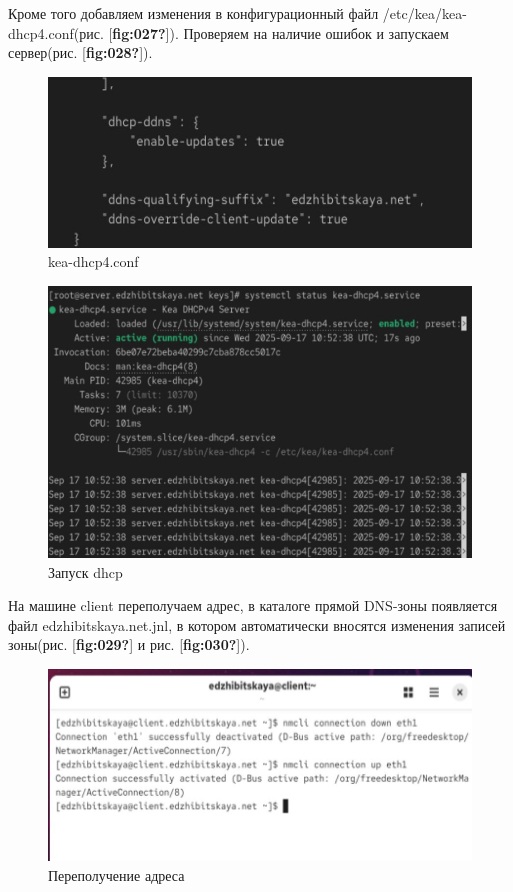 \documentclass[
  english,
  russian,
  12pt,
  a4paper,
  DIV=11,
  numbers=noendperiod]{scrreprt}
\begin{document}
Кроме того добавляем изменения в конфигурационный файл
/etc/kea/kea-dhcp4.conf(рис. {[}\textbf{fig:027?}{]}). Проверяем на
наличие ошибок и запускаем сервер(рис. {[}\textbf{fig:028?}{]}).

\begin{figure}

{\centering \includegraphics[width=0.7\linewidth,height=\textheight,keepaspectratio]{image/27.jpg}

}

\caption{kea-dhcp4.conf}

\end{figure}%

\begin{figure}

{\centering \includegraphics[width=0.7\linewidth,height=\textheight,keepaspectratio]{image/28.jpg}

}

\caption{Запуск dhcp}

\end{figure}%

На машине client переполучаем адрес, в каталоге прямой DNS-зоны
появляется файл edzhibitskaya.net.jnl, в котором автоматически вносятся
изменения записей зоны(рис. {[}\textbf{fig:029?}{]} и рис.
{[}\textbf{fig:030?}{]}).

\begin{figure}

{\centering \includegraphics[width=0.7\linewidth,height=\textheight,keepaspectratio]{image/29.jpg}

}

\caption{Переполучение адреса}

\end{figure}%
\end{document}
